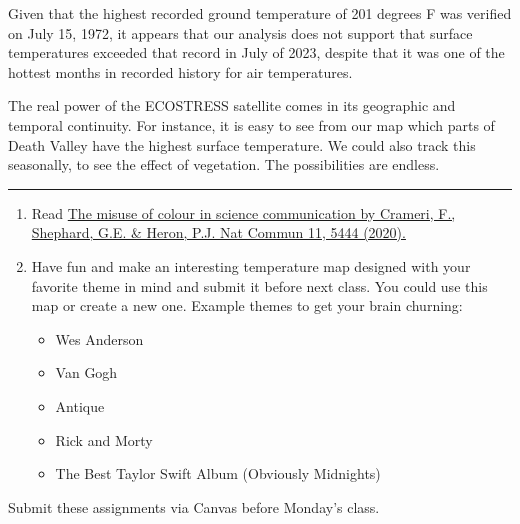 \documentclass[oneside,a4paper,11pt,explicit]{book}
\begin{document}
Given that the highest recorded ground temperature of 201 degrees F was verified on July 15, 1972, it appears that our analysis does not support that surface temperatures exceeded that record in July of 2023, despite that it was one of the hottest months in recorded history for air temperatures.


The real power of the ECOSTRESS satellite comes in its geographic and temporal continuity. For instance, it is easy to see from our map which parts of Death Valley have the highest surface temperature. We could also track this seasonally, to see the effect of vegetation. The possibilities are endless.

\vspace{.25em}

\hrule

\vspace{1 em}

\begin{tcolorbox}[colback=yellow!5!white,colframe=red!90!white,title= \Large Map of the Week Assignments]
	\large
	\begin{enumerate}
		\item Read \href{https://jeremydforsythe.github.io/icecream-tutorials/Tutorial4_AddingElementsToMaps/s41467-020-19160-7.pdf}{The misuse of colour in science communication by Crameri, F., Shephard, G.E. \& Heron, P.J.  Nat Commun 11, 5444 (2020).}
		\item Have fun and make an interesting temperature map designed with your favorite theme in mind and submit it before next class. You could use this map or create a new one. Example themes to get your brain churning:
		\begin{itemize}
			\item Wes Anderson
			\item Van Gogh
			\item Antique
			\item Rick and Morty
			\item The Best Taylor Swift Album (Obviously Midnights)
		\end{itemize}
	\end{enumerate}
	Submit these assignments via Canvas before Monday's class.
\end{tcolorbox}
\end{document}
